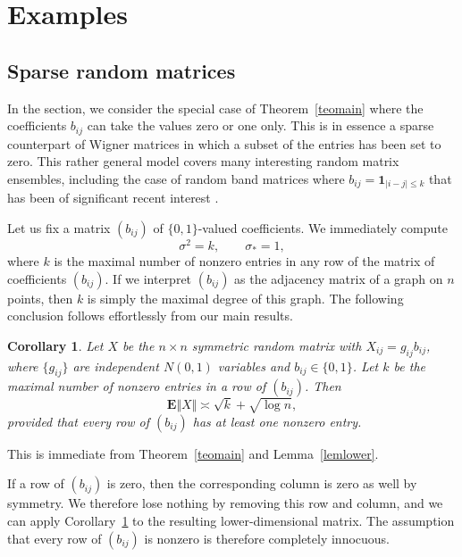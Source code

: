 \documentclass[aop,MSNbibl,dvips]{arximspdf}
\newcommand{\rrvert}{\vert}
\newcommand{\rrVert}{\Vert}
\newcommand{\llvert}{\vert}
\newcommand{\llVert}{\Vert}
\newtheorem{cor}[teo]{Corollary}
\newcommand{\EE}{\mathbf{E}}
\begin{document}
\section{Examples}\label{secex}

\subsection{Sparse random matrices}\label{secsparse}

In the section, we consider the special case of Theorem~\ref{teomain}
where the coefficients $b_{ij}$ can take the values zero or one only. This
is in essence a sparse counterpart of Wigner matrices in which a subset of
the entries has been set to zero. This rather general model covers many
interesting random matrix ensembles, including the case of random band
matrices where $b_{ij}=\mathbf{1}_{\llvert i-j\rrvert \le k}$ that
has been of
significant recent interest \cite{Kho08,Sod10,BGP14}.

Let us fix a matrix $(b_{ij})$ of $\{0,1\}$-valued coefficients.
We immediately compute
%
\[
\sigma^2 = k,\qquad\sigma_* = 1, %
\]
%
where $k$ is the maximal number of nonzero entries in any row of the
matrix of coefficients $(b_{ij})$. If we interpret $(b_{ij})$ as the
adjacency matrix of a graph on $n$ points, then $k$ is simply the maximal
degree of this graph. The following conclusion follows effortlessly from
our main results.

%
\begin{cor}
\label{corsparse}
Let $X$ be the $n\times n$ symmetric random matrix with
$X_{ij}=g_{ij}b_{ij}$, where $\{g_{ij}\}$ are independent $N(0,1)$
variables and $b_{ij}\in\{0,1\}$. Let $k$ be the maximal number of
nonzero entries in a row of $(b_{ij})$. Then
%
\[
\EE\llVert X\rrVert\asymp\sqrt{k} + \sqrt{\log n}, %
\]
%
provided that every row of $(b_{ij})$ has at least one nonzero entry.
\end{cor}

\begin{pf}
This is immediate from Theorem~\ref{teomain} and Lemma~\ref{lemlower}.
\end{pf}

%
\begin{rem}
If a row of $(b_{ij})$ is zero, then the corresponding column is zero as
well by symmetry. We therefore lose nothing by removing this row and
column, and we can apply Corollary~\ref{corsparse} to
the resulting lower-dimensional matrix. The assumption that every row of
$(b_{ij})$ is nonzero is therefore completely innocuous.
\end{rem}
\end{document}
